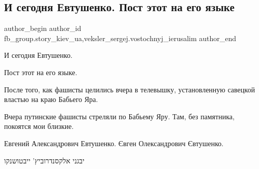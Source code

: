  
 
 
 
 
 
\subsection{И сегодня Евтушенко. Пост этот на его языке}
\label{sec:02_03_2022.fb.fb_group.story_kiev_ua.1.evtushenko_televyshka}
 
\ifcmt
 author_begin
   author_id fb_group.story_kiev_ua,veksler_sergej.vostochnyj_ierusalim
 author_end
\fi

И сегодня Евтушенко.

Пост этот на его языке.

После того, как фашисты целились вчера в телевышку, установленную савецкой
властью на краю Бабьего Яра.

Вчера путинские фашисты стреляли по Бабьему Яру. Там, без памятника, покоятся
мои близкие.

Евгений Александрович Евтушенко. Євген Олександрович Євтушенко.

יבגני אלקסנדרוביץ' ייבטושנקו


